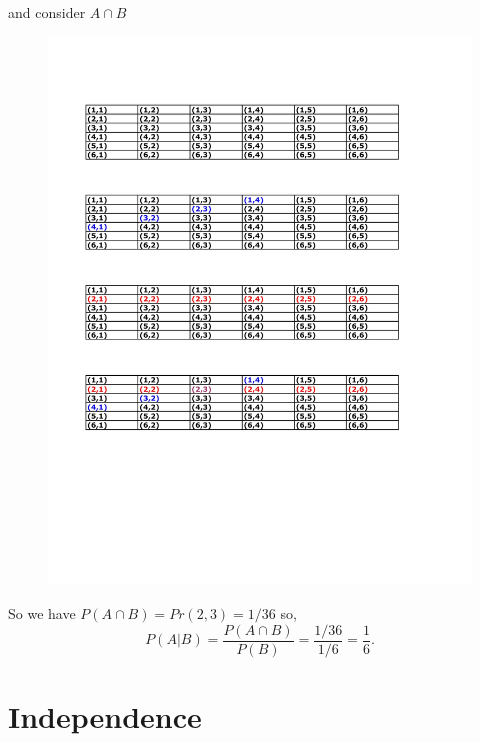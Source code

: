 \documentclass[notes=show,handout]{beamer}\usepackage[]{graphicx}\usepackage[]{color}
\newcommand{\nn}{\nonumber}
\begin{document}
\begin{frame}{\secname}

  \begin{example} [A check]
  and consider $A \cap B$

  \begin{figure}[h!]
  \centering
  \includegraphics[scale=0.7]{img/c4.pdf}
  \end{figure}
  So we have  $P(A \cap B) = Pr (2,3) = 1/36$ so,
  $$
  P(A\vert B) = \frac{P(A \cap B)}{P(B)}  =  \frac{1/36}{1/6} = \frac{1}{6}. \nn
  $$
  \end{example}
\end{frame}

\section{Independence}
\end{document}
